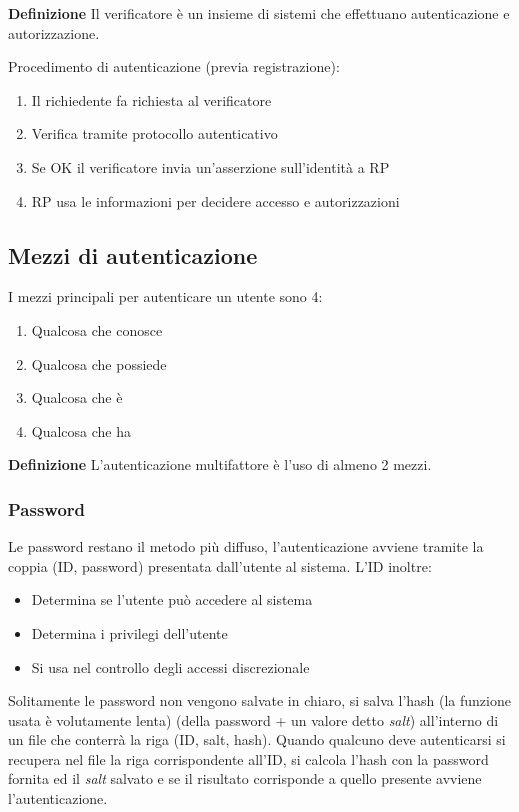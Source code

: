 \documentclass{article}
\newcommand{\df}[1]{\noindent\textbf{Definizione } #1.\newline}
\begin{document}
\df{Il verificatore è un insieme di sistemi che effettuano autenticazione e autorizzazione}

\noindent Procedimento di autenticazione (previa registrazione):
\begin{enumerate}
    \item Il richiedente fa richiesta al verificatore
    \item Verifica tramite protocollo autenticativo
    \item Se OK il verificatore invia un'asserzione sull'identità a RP
    \item RP usa le informazioni per decidere accesso e autorizzazioni\newline
\end{enumerate}

\newpage

\subsection{Mezzi di autenticazione}

I mezzi principali per autenticare un utente sono 4:
\begin{enumerate}
    \item Qualcosa che conosce
    \item Qualcosa che possiede
    \item Qualcosa che è
    \item Qualcosa che ha\newline
\end{enumerate}

\df{L'autenticazione multifattore è l'uso di almeno 2 mezzi}

\subsubsection{Password}

Le password restano il metodo più diffuso, l'autenticazione avviene tramite la coppia (ID, password) presentata dall'utente al sistema. L'ID inoltre:
\begin{itemize}
    \item Determina se l'utente può accedere al sistema
    \item Determina i privilegi dell'utente
    \item Si usa nel controllo degli accessi discrezionale\newline
\end{itemize}

\noindent Solitamente le password non vengono salvate in chiaro, si salva l'hash (la funzione usata è volutamente lenta) (della password + un valore detto \textit{salt}) all'interno di un file che conterrà la riga (ID, salt, hash). Quando qualcuno deve autenticarsi si recupera nel file la riga corrispondente all'ID, si calcola l'hash con la password fornita ed il \textit{salt} salvato e se il risultato corrisponde a quello presente avviene l'autenticazione.\newline
\end{document}
